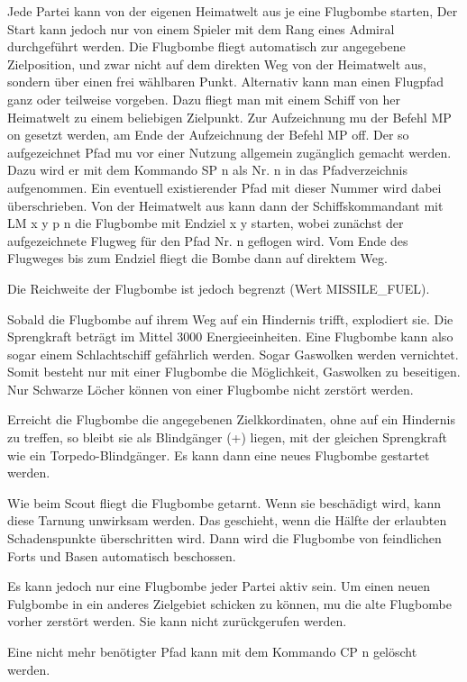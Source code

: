 Jede Partei kann von der eigenen Heimatwelt aus je eine Flugbombe starten,
Der Start kann jedoch nur von einem Spieler mit dem Rang eines
Admiral durchgef\"uhrt werden. Die
Flugbombe fliegt automatisch zur angegebene Zielposition, und zwar nicht auf 
dem direkten Weg von der Heimatwelt aus, sondern \"uber einen frei w\"ahlbaren
Punkt. Alternativ kann man einen Flugpfad ganz oder teilweise vorgeben.
Dazu fliegt man mit einem Schiff von her Heimatwelt zu einem beliebigen
Zielpunkt. Zur Aufzeichnung mu\3 der Befehl MP on gesetzt werden, am Ende
der Aufzeichnung der Befehl MP off. Der so aufgezeichnet Pfad mu\3 vor einer 
Nutzung allgemein zug\"anglich gemacht werden. Dazu wird er mit dem Kommando
SP n als Nr. n in das Pfadverzeichnis aufgenommen. Ein eventuell existierender
Pfad mit dieser Nummer wird dabei \"uberschrieben. 
Von der Heimatwelt aus kann dann
der Schiffskommandant mit LM x y p n die Flugbombe mit Endziel x y starten,
wobei zun\"achst der aufgezeichnete Flugweg f\"ur den Pfad Nr. n
geflogen wird. Vom Ende des
Flugweges bis zum Endziel fliegt die Bombe dann auf direktem Weg.

Die Reichweite der Flugbombe ist jedoch begrenzt (Wert MISSILE\_FUEL).

Sobald die Flugbombe auf ihrem Weg auf ein Hindernis trifft, explodiert sie.
Die Sprengkraft betr\"agt im Mittel 3000 Energieeinheiten. Eine
Flugbombe kann also sogar
einem Schlachtschiff gef\"ahrlich werden. Sogar Gaswolken werden vernichtet.
Somit besteht nur mit einer Flugbombe die M\"oglichkeit, Gaswolken zu 
beseitigen.
Nur Schwarze L\"ocher k\"onnen von einer Flugbombe nicht zerst\"ort werden.

Erreicht die Flugbombe die angegebenen Zielkkordinaten, ohne auf ein Hindernis
zu treffen, so bleibt sie als Blindg\"anger (+) liegen, mit der gleichen
Sprengkraft wie ein Torpedo-Blindg\"anger. Es kann dann eine neues Flugbombe
gestartet werden.

Wie beim Scout fliegt die Flugbombe getarnt. Wenn sie besch\"adigt wird,
kann diese Tarnung unwirksam werden. Das geschieht, wenn die H\"alfte
der erlaubten Scha\-dens\-punkte \"uberschritten wird.
Dann wird die Flugbombe von 
feindlichen Forts und Basen automatisch beschossen.

Es kann jedoch nur eine Flugbombe jeder Partei aktiv sein. Um einen neuen
Fulgbombe in ein anderes Zielgebiet schicken zu k\"onnen, mu\3 die alte
Flugbombe vorher zerst\"ort werden. Sie kann nicht zur\"uckgerufen werden.

Eine nicht mehr ben\"otigter Pfad kann mit dem Kommando CP n gel\"oscht werden.

